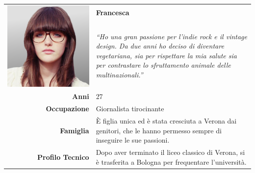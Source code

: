 \begin{table}[H]
	\begin{centering}
	\begin{tabular} { | r  p{12cm} | }
		\hline
		\multirow{2}{*}{
			\begin{minipage}{.15 \textheight}
				\vspace{0.1in}
				\includegraphics[width=\linewidth]{img/personas/francesca.png}
			\end{minipage}
		}
	 	& \vspace{0.1 in}\Large\textbf{Francesca} \\ 
		& \vspace{0.1 in}\large{\emph{``Ho una gran passione per l'indie rock e
il vintage design. Da due anni ho deciso di diventare vegetariana, sia
per rispettare la mia salute sia per contrastare lo sfruttamento animale
delle multinazionali.''}}\\[8ex] 
		\hline
		\textbf{Anni} & 27 \\ \hline
		\textbf{Occupazione} & Giornalista tirocinante \\ \hline
		\textbf{Famiglia} & È figlia unica ed è stata cresciuta 
a Verona dai genitori, che le hanno permesso sempre di inseguire le sue
passioni.\\ \hline
		\textbf{Profilo Tecnico} & Dopo aver terminato il liceo classico
di Verona, si è trasferita a Bologna per frequentare l'università.

\end{tabular}
\end{centering}
\end{table}
